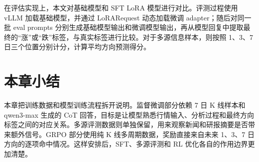 在评估实现上，本文对基础模型和 SFT LoRA 模型进行对比。评测过程使用 vLLM 加载基础模型，并通过 LoRARequest 动态加载微调 adapter；随后对同一批 eval prompts 分别生成基础模型输出和微调模型输出，再从模型回复中提取最终的“涨”或“跌”标签，与真实标签进行比较。对于多源信息样本，则按照 1、3、7 日三个位置分别计分，计算平均方向预测得分。

\section{本章小结}

本章把训练数据和模型训练流程拆开说明。监督微调部分依赖 7 日 K 线样本和 qwen3-max 生成的 CoT 回答，目标是让模型熟悉行情输入、分析过程和最终方向标签之间的对应关系。多源评测数据则单独保留，用来观察新闻和研报摘要是否带来额外信号。GRPO 部分使用纯 K 线多周期数据，奖励直接来自未来 1、3、7 日方向的逐项命中情况。这样安排后，SFT、多源评测和 RL 优化各自的作用边界更加清楚。
